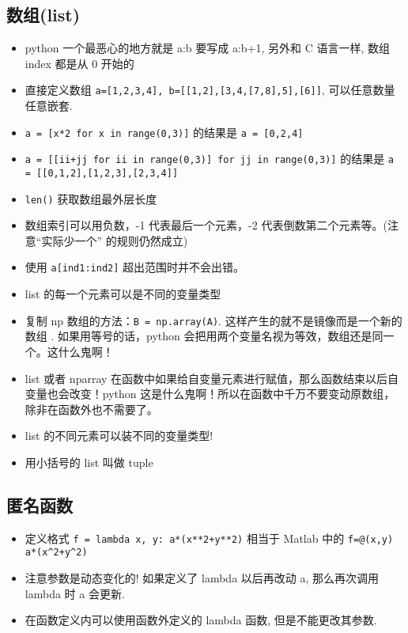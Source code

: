 \subsection{数组(list)}
\begin{itemize}
\item python 一个最恶心的地方就是 a:b 要写成 a:b+1, 另外和 C 语言一样, 数组 index 都是从 0 开始的
\item 直接定义数组 \verb`a=[1,2,3,4], b=[[1,2],[3,4,[7,8],5],[6]]`, 可以任意数量任意嵌套.
\item \verb`a = [x*2 for x in range(0,3)]` 的结果是 \verb`a = [0,2,4]`
\item \verb`a = [[ii+jj for ii in range(0,3)] for jj in range(0,3)]` 的结果是 \verb`a = [[0,1,2],[1,2,3],[2,3,4]]`
\item \verb`len()` 获取数组最外层长度
\item 数组索引可以用负数，-1 代表最后一个元素，-2 代表倒数第二个元素等。(注意“实际少一个” 的规则仍然成立)
\item 使用 \verb`a[ind1:ind2]` 超出范围时并不会出错。
\item list 的每一个元素可以是不同的变量类型
\item 复制 np 数组的方法：\verb`B = np.array(A)`. 这样产生的就不是镜像而是一个新的数组 . 如果用等号的话，python 会把用两个变量名视为等效，数组还是同一个。这什么鬼啊！
\item list 或者 nparray 在函数中如果给自变量元素进行赋值，那么函数结束以后自变量也会改变！python 这是什么鬼啊！所以在函数中千万不要变动原数组，除非在函数外也不需要了。
\item list 的不同元素可以装不同的变量类型!
\item 用小括号的 list 叫做 tuple
\end{itemize}

\subsection{匿名函数}
\begin{itemize}
\item 定义格式 \verb`f = lambda x, y: a*(x**2+y**2)` 相当于 Matlab 中的 \verb`f=@(x,y) a*(x^2+y^2)`
\item 注意参数是动态变化的! 如果定义了 lambda 以后再改动 a, 那么再次调用 lambda 时 a 会更新.
\item 在函数定义内可以使用函数外定义的 lambda 函数, 但是不能更改其参数.
\end{itemize}

